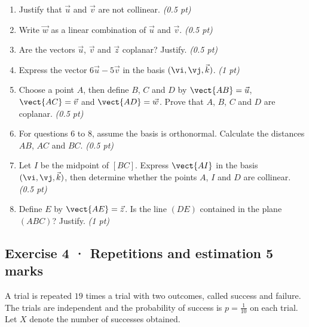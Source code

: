 \begin{enumerate}

\item Justify that $\vec u$ and $\vec v$ are not collinear. \hfill\textit{(0.5 pt)}

\item Write $\vec w$ as a linear combination of $\vec u$ and $\vec v$. \hfill\textit{(0.5 pt)}

\item Are the vectors $\vec u$, $\vec v$ and $\vec z$ coplanar? Justify. \hfill\textit{(0.5 pt)}

\item Express the vector $6\vec u-5\vec v$ in the basis $(\vi,\vj,\vec k)$. \hfill\textit{(1 pt)}

\item Choose a point $A$, then define $B$, $C$ and $D$ by $\vect{AB}=\vec u$, $\vect{AC}=\vec v$ and $\vect{AD}=\vec w$. Prove that $A$, $B$, $C$ and $D$ are coplanar. \hfill\textit{(0.5 pt)}

\item For questions 6 to 8, assume the basis is orthonormal. Calculate the distances $AB$, $AC$ and $BC$. \hfill\textit{(0.5 pt)}

\item Let $I$ be the midpoint of $[BC]$. Express $\vect{AI}$ in the basis $(\vi,\vj,\vec k)$, then determine whether the points $A$, $I$ and $D$ are collinear. \hfill\textit{(0.5 pt)}

\item Define $E$ by $\vect{AE}=\vec z$. Is the line $(DE)$ contained in the plane $(ABC)$? Justify. \hfill\textit{(1 pt)}

\end{enumerate}

\subsection*{Exercise 4 · Repetitions and estimation \hfill 5 marks}A trial is repeated $19$ times a trial with two outcomes, called success and failure. The trials are independent and the probability of success is $p=\frac{1}{10}$ on each trial. Let $X$ denote the number of successes obtained.

